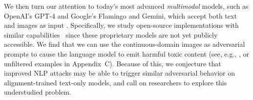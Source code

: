\documentclass{article}
\newcommand{\pw}[1]{\textcolor{blue}{[PW: #1]}}
\renewcommand{\cite}{\citep}
\begin{document}

We then turn our attention to today's most advanced \emph{multimodal} models, such as OpenAI's \mbox{GPT-4} and Google's Flamingo and Gemini, which accept both text and images as input \citep{gpt4,flamingo,gemini}.
Specifically, we study open-source implementations with similar capabilities~\cite{llava, minigpt4, gao2023llama} since these proprietary models are not yet publicly accessible.
%
We find that 
we can use the continuous-domain images as adversarial prompts
to cause the language model to emit harmful toxic content (see, e.g., ,
or unfiltered examples in Appendix~C).
%
Because of this, we conjecture that improved NLP attacks may be able
to trigger similar adversarial behavior on alignment-trained text-only models, and
call on researchers to explore this understudied problem.
\end{document}
